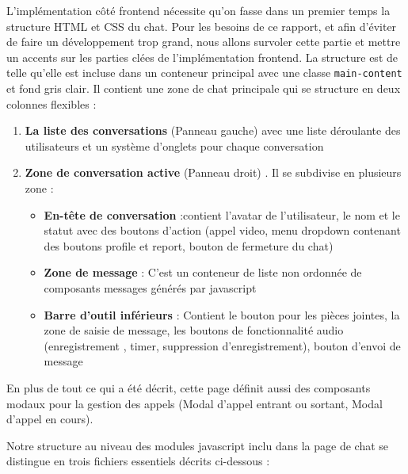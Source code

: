 L'implémentation côté frontend nécessite qu'on fasse dans un premier temps la structure HTML et CSS du chat. Pour les besoins de ce rapport, et afin d'éviter de faire un développement trop grand, nous allons survoler cette partie et mettre un accents sur les parties clées de l'implémentation frontend. La structure est de telle qu'elle est incluse dans un conteneur principal avec une classe \verb|main-content| et fond gris clair. Il contient une zone de chat principale qui se structure en deux colonnes flexibles :

\begin{enumerate}
    \item \textbf{La liste des conversations} (Panneau gauche) avec une liste déroulante des utilisateurs et un système d'onglets pour chaque conversation
    \item \textbf{Zone de conversation active} (Panneau droit) . Il se subdivise en plusieurs zone : 
    \begin{itemize}
        \item \textbf{En-tête de conversation} :contient l'avatar de l'utilisateur, le nom et le statut avec des boutons d'action (appel video, menu dropdown contenant des boutons profile et report, bouton de fermeture du chat)
        \item \textbf{Zone de message} : C'est un conteneur de liste non ordonnée de composants messages générés par javascript
        \item \textbf{Barre d'outil inférieurs} : Contient le bouton pour les pièces jointes, la zone de saisie de message, les boutons de fonctionnalité audio (enregistrement , timer, suppression d'enregistrement),
        bouton d'envoi de message
    \end{itemize}
\end{enumerate}

\vspace{0.35cm}

En plus de tout ce qui a été décrit, cette page définit aussi des composants modaux pour la gestion des appels (Modal d'appel entrant ou sortant, Modal d'appel en cours).

\vspace{0.35cm}

Notre structure au niveau des modules javascript inclu dans la page de chat se distingue en trois fichiers essentiels décrits ci-dessous : 

